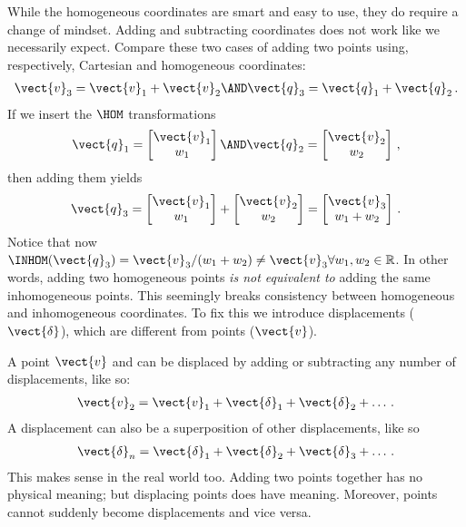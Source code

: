 \documentclass[oneandhalfcolumn]{coursenotes-handout}
\begin{document}
While the homogeneous coordinates are smart and easy to use, they do require a change of mindset. Adding and subtracting coordinates does not work like we necessarily expect. Compare these two cases of adding two points using, respectively, Cartesian and homogeneous coordinates:
\begin{align}
\vect{v}_3 = \vect{v}_1 + \vect{v}_2 \AND \vect{q}_3 = \vect{q}_1 + \vect{q}_2 \,.
\end{align}
If we insert the \(\HOM\) transformations
\begin{align}
\vect{q}_1 = \begin{bmatrix}\vect{v}_1 \\ w_1 \end{bmatrix} \AND \vect{q}_2 = \begin{bmatrix}\vect{v}_2 \\ w_2 \end{bmatrix} \,,
\end{align}
then adding them yields
\begin{align}
\vect{q}_3 = \begin{bmatrix}\vect{v}_1 \\ w_1 \end{bmatrix} + \begin{bmatrix}\vect{v}_2 \\ w_2 \end{bmatrix} = \begin{bmatrix}\vect{v}_3 \\ w_1 + w_2 \end{bmatrix} \,.
\end{align}
Notice that now \(\INHOM(\vect{q}_3) = \vect{v}_3 / (w_1 + w_2) \neq \vect{v}_3 \forall w_1, w_2 \in \mathbb{R} \). In other words, adding two homogeneous points \emph{is not equivalent to} adding the same inhomogeneous points. This seemingly breaks consistency between homogeneous and inhomogeneous coordinates. To fix this we introduce displacements (\(\vect{\delta}\)), which are different from points (\(\vect{v}\)).

A point \(\vect{v}\) and can be displaced by adding or subtracting any number of displacements, like so:
\begin{align}
\vect{v}_2 = \vect{v}_1 + \vect{\delta}_1 + \vect{\delta}_2 + \dots \,.
\end{align}
A displacement can also be a superposition of other displacements, like so
\begin{align}
\vect{\delta}_n = \vect{\delta}_1 + \vect{\delta}_2 + \vect{\delta}_3 + \dots \,.
\end{align}
This makes sense in the real world too. Adding two points together has no physical meaning; but displacing points does have meaning. Moreover, points cannot suddenly become displacements and vice versa.
\end{document}
